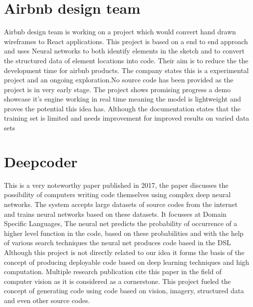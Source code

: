   \section{Airbnb design team}
    Airbnb design team is working on a project which would convert hand drawn wireframes to React applications. This project is based on a end to end approach and uses Neural networks to both identify elements in the sketch and to convert the structured data of element locations into code. Their aim is to reduce the the development time for airbnb products. The company states this is a experimental project and an ongoing exploration.No source code has been provided as the project is in very early stage. The project shows promising progress a  demo showcase it’s engine working in real time meaning the model is lightweight and proves the potential this idea has. Although the documentation states that the training set is limited and needs improvement for improved results on varied data sets

  \section{Deepcoder}
    This is a very noteworthy paper published in 2017, the paper discusses the possibility of computers writing code themselves  using complex deep neural networks. The system accepts large datasets of source codes from the internet and trains neural networks based on these datasets. It focusses at Domain Specific Languages, The neural net predicts the probability of occurrence of a higher level function in the code, based on these probabilities and with the help of various search techniques the  neural net produces code based in the DSL
    Although this project is not directly related to our idea it forms the basis of the concept of producing deployable code based on deep learning techniques and high computation. Multiple research publication cite this paper in the field of computer vision as it is considered as  a cornerstone. This project fueled the concept of generating code using code based on vision, imagery, structured data and even other source codes.




